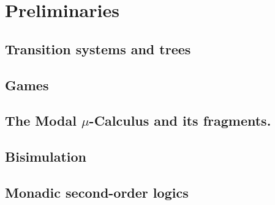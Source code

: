 \documentclass[prodmode,acmtecs]{acmsmall} %
\begin{document}
\clearpage


\section{Preliminaries}\label{sec:prel}

\subsection{Transition systems and trees} \label{ssec:prelim_trees}

\subsection{Games}



\subsection{The Modal $\mu$-Calculus and its fragments.}\label{subsec:mu}



\subsection{Bisimulation}


%
%


\subsection{Monadic second-order logics}\label{sec:prel-so}


\clearpage

%
\end{document}
